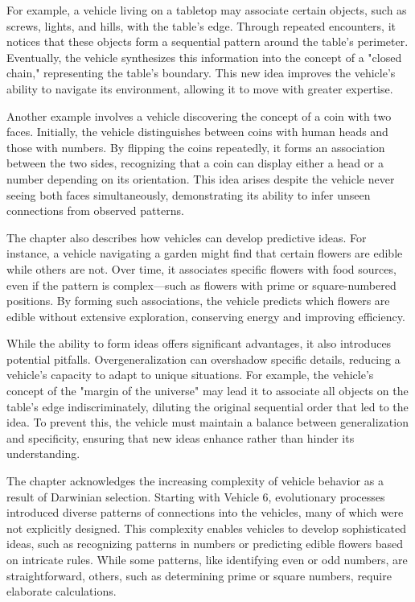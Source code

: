 \documentclass{article}
\begin{document}
	For example, a vehicle living on a tabletop may associate certain objects, such as screws, lights, and hills, with the table's edge. Through repeated encounters, it notices that these objects form a sequential pattern around the table's perimeter. Eventually, the vehicle synthesizes this information into the concept of a "closed chain," representing the table's boundary. This new idea improves the vehicle's ability to navigate its environment, allowing it to move with greater expertise.

	Another example involves a vehicle discovering the concept of a coin with two faces. Initially, the vehicle distinguishes between coins with human heads and those with numbers. By flipping the coins repeatedly, it forms an association between the two sides, recognizing that a coin can display either a head or a number depending on its orientation. This idea arises despite the vehicle never seeing both faces simultaneously, demonstrating its ability to infer unseen connections from observed patterns.

	The chapter also describes how vehicles can develop predictive ideas. For instance, a vehicle navigating a garden might find that certain flowers are edible while others are not. Over time, it associates specific flowers with food sources, even if the pattern is complex—such as flowers with prime or square-numbered positions. By forming such associations, the vehicle predicts which flowers are edible without extensive exploration, conserving energy and improving efficiency.

	While the ability to form ideas offers significant advantages, it also introduces potential pitfalls. Overgeneralization can overshadow specific details, reducing a vehicle’s capacity to adapt to unique situations. For example, the vehicle’s concept of the "margin of the universe" may lead it to associate all objects on the table's edge indiscriminately, diluting the original sequential order that led to the idea. To prevent this, the vehicle must maintain a balance between generalization and specificity, ensuring that new ideas enhance rather than hinder its understanding.

	The chapter acknowledges the increasing complexity of vehicle behavior as a result of Darwinian selection. Starting with Vehicle 6, evolutionary processes introduced diverse patterns of connections into the vehicles, many of which were not explicitly designed. This complexity enables vehicles to develop sophisticated ideas, such as recognizing patterns in numbers or predicting edible flowers based on intricate rules. While some patterns, like identifying even or odd numbers, are straightforward, others, such as determining prime or square numbers, require elaborate calculations.
\end{document}
